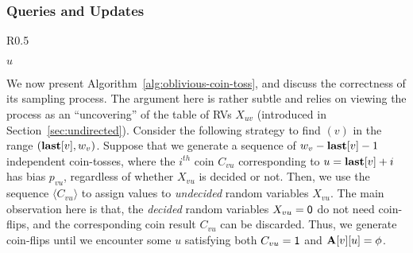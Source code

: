 \subsubsection{Queries and Updates}
\label{sec:nn-correctness}
\begin{wrapfigure}[15]{R}{0.5\textwidth}
\vspace{-3.0em}
\begin{framed}
    \renewcommand\figurename{Algorithm}
    \caption{Sampling }
    \label{alg:oblivious-coin-toss}
    \begin{algorithmic}[1]
            \State{$w_v \gets \min \{(P_v \cap (u, n]) \cup \{n+1\}\}$}
            \Repeat
            \EndIf
            \State \Return $u$
        \EndProcedure
    \end{algorithmic}
\end{framed}
\end{wrapfigure}
We now present Algorithm~\ref{alg:oblivious-coin-toss}, and discuss the correctness of its sampling process.
The argument here is rather subtle and relies on viewing the process as an ``uncovering'' of the table of RVs $X_{uv}$
(introduced in Section~\ref{sec:undirected}).
Consider the following strategy to find $(v)$ in the range $(\mathbf{last}[v],w_v)$.
Suppose that we generate a sequence of $w_v-\mathbf{last}[v]-1$ independent coin-tosses,
where the $i^{th}$ coin $C_{vu}$ corresponding to $u = \mathbf{last}[v]+i$ has bias $p_{vu}$, regardless of whether $X_{vu}$ is decided or not.
Then, we use the sequence $\langle C_{vu} \rangle$ to assign values to \emph{undecided} random variables $X_{vu}$.
The main observation here is that, the \emph{decided} random variables $X_{vu} = \mathsf{0}$ do not need coin-flips,
and the corresponding coin result $C_{vu}$ can be discarded.
Thus, we generate coin-flips until we encounter some $u$ satisfying both $C_{vu} = \mathsf{1}$ and $\mathbf{A}[v][u] = \phi$.

